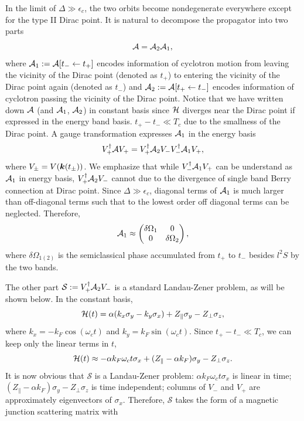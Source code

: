 \documentclass[aps, prb, showpacs, twocolumn, notitlepage, superscriptaddress]{revtex4-1}
\begin{document}
In the limit of $\Delta\gg\epsilon_c$, the two orbits become nondegenerate everywhere except for the type II Dirac point. It is natural to decompose the propagator into two parts
\begin{equation}
{\cal A} = {\cal A}_2{\cal A}_1,
\end{equation}
where ${\cal A}_1:={\cal A}[t_-\leftarrow t_+]$ encodes information of cyclotron motion from leaving the vicinity of the Dirac point (denoted as $t_+$) to entering the vicinity of the Dirac point again (denoted as $t_-$) and ${\cal A}_2:={\cal A}[t_+\leftarrow t_-]$ encodes information of cyclotron passing the vicinity of the Dirac point. Notice that we have written down ${\cal A}$ (and ${\cal A}_1$, ${\cal A}_2$) in constant basis since ${\cal H}$ diverges near the Dirac point if expressed in the energy band basis. $t_+-t_-\ll T_c$ due to the smallness of the Dirac point. A gauge transformation expresses ${\cal A}_1$ in the energy basis
\begin{equation}
V_+^\dagger{\cal A} V_+ = V_+^\dagger{\cal A}_2V_-V_-^\dagger{\cal A}_1V_+,
\end{equation}
where $V_\pm=V(\boldsymbol{k}(t_\pm))$. We emphasize that while $V_-^\dagger{\cal A}_1V_+$ can be understand as ${\cal A}_1$ in energy basis, $V_+^\dagger{\cal A}_2V_-$ cannot due to the divergence of single band Berry connection at Dirac point. Since $\Delta\gg\epsilon_c$, diagonal terms of ${\cal A}_1$ is much larger than off-diagonal terms such that to the lowest order off diagonal terms can be neglected. Therefore, 
\begin{equation}
{\cal A}_1\approx\begin{pmatrix} \delta \Omega_1 & 0 \\ 0 & \delta \Omega_2 \end{pmatrix},
\end{equation}
where $\delta\Omega_{1(2)}$ is the semiclassical phase accumulated from $t_+$ to $t_-$ besides $l^2 S$ by the two bands.


The other part $\mathcal{S}:=V_+^\dagger{\cal A}_2V_-$ is a standard Landau-Zener problem, as will be shown below. In the constant basis, 
\begin{equation}
{\cal H}(t)=\alpha(k_{x}\sigma_{y}-k_{y}\sigma_{x})+Z_\parallel\sigma_{y}-Z_\perp\sigma_{z},
\end{equation}
where $k_x=-k_F \cos(\omega_c t)$ and $k_y=k_F \sin(\omega_c t)$. Since $t_+-t_-\ll T_c$, we can keep only the linear terms in $t$,
\begin{equation}
{\cal H}(t)\approx-\alpha k_F \omega_c t\sigma_x+(Z_\parallel-\alpha k_F)\sigma_y-Z_\perp\sigma_z.
\end{equation}
It is now obvious that $\mathcal{S}$ is a Landau-Zener problem: $\alpha k_F \omega_c t\sigma_x$ is linear in time; $(Z_\parallel-\alpha k_F)\sigma_y-Z_\perp\sigma_z$ is time independent; columns of $V_-$ and $V_+$ are approximately eigenvectors of $\sigma_x$. Therefore, $\mathcal{S}$ takes the form of a magnetic junction scattering matrix with
\end{document}
